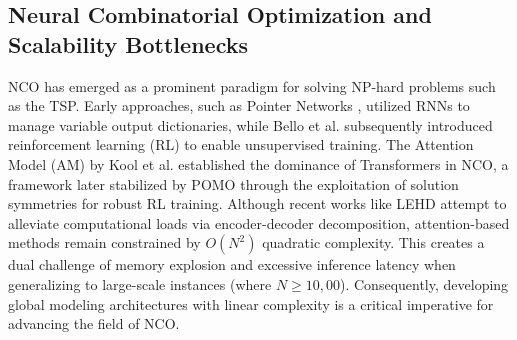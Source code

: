 \documentclass{article}
\theoremstyle{plain}
\theoremstyle{definition}
\theoremstyle{remark}
\begin{document}
\subsection{Neural Combinatorial Optimization and Scalability Bottlenecks}
\vspace{-5pt}
NCO has emerged as a prominent paradigm for solving NP-hard problems such as the TSP. Early approaches, such as Pointer Networks \cite{1}, utilized RNNs to manage variable output dictionaries, while Bello et al. \cite{2} subsequently introduced reinforcement learning (RL) to enable unsupervised training. The Attention Model (AM) by Kool et al. \cite{3} established the dominance of Transformers in NCO, a framework later stabilized by POMO \cite{4} through the exploitation of solution symmetries for robust RL training. Although recent works like LEHD \cite{5} attempt to alleviate computational loads via encoder-decoder decomposition, attention-based methods remain constrained by $O(N^2)$ quadratic complexity. This creates a dual challenge of memory explosion and excessive inference latency when generalizing to large-scale instances (where $N \ge 10,00$). Consequently, developing global modeling architectures with linear complexity is a critical imperative for advancing the field of NCO.
\vspace{-10pt}
\end{document}
